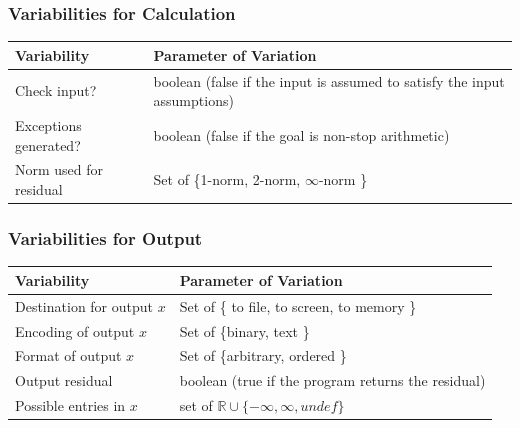 \documentclass[t,12pt,numbers,fleqn]{beamer}
\newcommand{\colA}{2.1cm}
\newcommand{\colB}{6.9cm}
\begin{document}
\begin{frame}

\frametitle{Variabilities for Calculation}

\begin{tabular}{| p{\colA} | p{\colB} | }
\hline
\textbf{Variability} & \textbf{Parameter of Variation} \\
\hline
Check input? & boolean (false if the input is assumed to satisfy the input assumptions)\\ 
\hline
Exceptions generated? & boolean (false if the goal is non-stop arithmetic)\\ 
\hline
Norm used for residual & Set of \{1-norm, 2-norm, $\infty$-norm \} \\
\hline
\end{tabular}


\end{frame}


\begin{frame}

\frametitle{Variabilities for Output}

\begin{tabular}{| p{\colA} | p{\colB} | }
\hline
\textbf{Variability} & \textbf{Parameter of Variation} \\
\hline
Destination for output $x$ & Set of \{ to file, to screen, to memory \} \\
\hline
Encoding of output $x$ & Set of \{binary, text \} \\
\hline
Format of output $x$ & Set of \{arbitrary, ordered \} \\
\hline
Output residual & boolean (true if the program returns the residual) \\
\hline
Possible entries in $x$ & set of $\mathbb{R} \cup \{- \infty, \infty, undef \}$ \\
\hline
\end{tabular}

\end{frame}

\end{document}
